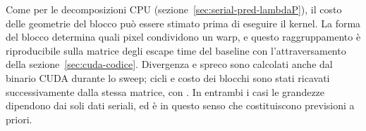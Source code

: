 
Come per le decomposizioni CPU (sezione~\ref{sec:serial-pred-lambdaP}), il costo
delle geometrie del blocco può essere stimato prima di eseguire il kernel. La
forma del blocco determina quali pixel condividono un warp, e questo
raggruppamento è riproducibile sulla matrice degli escape time del baseline con
l'attraversamento della sezione~\ref{sec:cuda-codice}. Divergenza e spreco sono
calcolati anche dal binario CUDA durante lo sweep; cicli e costo dei blocchi sono
stati ricavati successivamente dalla stessa matrice, con
. In entrambi i casi le grandezze
dipendono dai soli dati seriali, ed è in questo senso che costituiscono
previsioni a priori.

